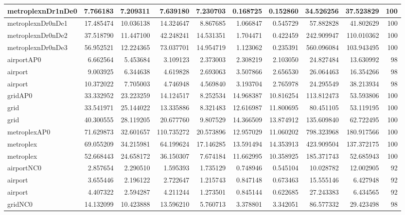 \begin{longtable}{|l|r|r|r|r|r|r|r|r|r|}
metroplexnDr1nDe0 & 7.766183 & 7.209311 & 7.639180 & 7.230703 & 0.168725 & 0.152860 & 34.526256 & 37.523829 & 100 \\ \hline
metroplexnDr0nDe1 & 17.485474 & 10.036138 & 14.324647 & 8.867685 & 1.066847 & 0.545729 & 57.882828 & 41.802629 & 100 \\ \hline
metroplexnDr0nDe2 & 37.518790 & 11.447100 & 42.248241 & 14.531351 & 1.704471 & 0.422459 & 242.909947 & 110.010362 & 100 \\ \hline
metroplexnDr0nDe3 & 56.952521 & 12.224365 & 73.037701 & 14.954719 & 1.123062 & 0.235391 & 560.096084 & 103.943495 & 100 \\ \hline
airportAP0 & 6.662564 & 5.453684 & 3.109123 & 2.373003 & 2.308219 & 2.103050 & 24.827484 & 13.630992 & 98 \\ \hline
airport & 9.003925 & 6.344638 & 4.619828 & 2.693063 & 3.507866 & 2.656530 & 26.064463 & 16.354266 & 98 \\ \hline
airport & 10.372022 & 7.705003 & 4.746948 & 4.569840 & 3.193704 & 2.765978 & 24.295549 & 38.213934 & 98 \\ \hline
gridAP0 & 33.332952 & 23.223259 & 14.124517 & 8.252534 & 14.968387 & 10.816254 & 113.812473 & 53.593806 & 100 \\ \hline
grid & 33.541971 & 25.144022 & 13.335886 & 8.321483 & 12.616987 & 11.800695 & 80.451105 & 53.119195 & 100 \\ \hline
grid & 40.300555 & 28.119205 & 20.677760 & 9.807529 & 14.366509 & 13.874912 & 135.609840 & 62.722495 & 100 \\ \hline
metroplexAP0 & 71.629873 & 32.601657 & 110.735272 & 20.573896 & 12.957029 & 11.060202 & 798.323968 & 180.917566 & 100 \\ \hline
metroplex & 69.055209 & 34.215981 & 64.199624 & 17.146285 & 13.591494 & 14.353913 & 423.909504 & 137.372175 & 100 \\ \hline
metroplex & 52.668443 & 24.658172 & 36.150307 & 7.674184 & 11.662995 & 10.358925 & 185.371743 & 52.685943 & 100 \\ \hline
airportNC0 & 2.857654 & 2.290510 & 1.595393 & 1.735129 & 0.748946 & 0.545104 & 10.028782 & 12.002905 & 92 \\ \hline
airport & 3.655446 & 2.196122 & 2.722647 & 1.215743 & 0.847148 & 0.673463 & 15.555146 & 6.427948 & 92 \\ \hline
airport & 4.407322 & 2.594287 & 4.211244 & 1.273501 & 0.845144 & 0.622685 & 27.243383 & 6.434565 & 92 \\ \hline
gridNC0 & 14.132099 & 10.423888 & 13.596210 & 5.760713 & 3.378801 & 3.342051 & 86.577332 & 29.423498 & 98 \\ \hline

\end{longtable}
